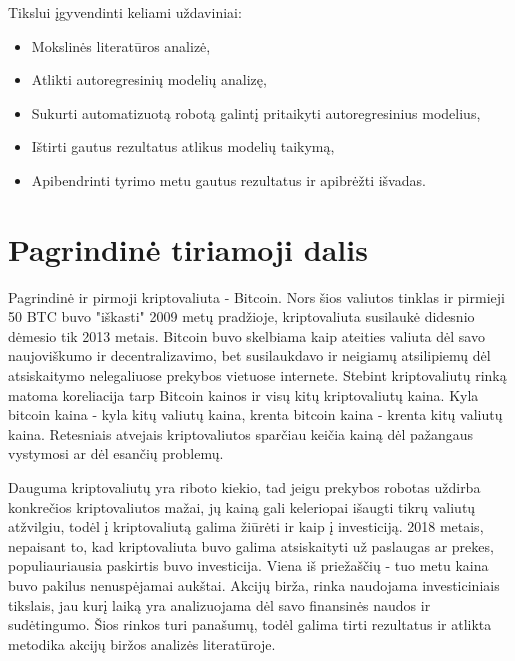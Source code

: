 \documentclass{VUMIFInfKursinis}
\begin{document}
Tikslui įgyvendinti keliami uždaviniai:
\begin{itemize}
  \item Mokslinės literatūros analizė, %
  \item Atlikti autoregresinių modelių analizę, %
  \item Sukurti automatizuotą robotą galintį pritaikyti autoregresinius modelius,
  \item Ištirti gautus rezultatus atlikus modelių taikymą, %
  \item Apibendrinti tyrimo metu gautus rezultatus ir apibrėžti išvadas.
\end{itemize}


\section{Pagrindinė tiriamoji dalis}
Pagrindinė ir pirmoji kriptovaliuta - Bitcoin. Nors šios valiutos tinklas ir pirmieji 50 BTC buvo "iškasti" 2009 metų pradžioje, kriptovaliuta susilaukė didesnio dėmesio
tik 2013 metais\cite{macdonell2014popping}. Bitcoin buvo skelbiama kaip ateities valiuta dėl savo naujoviškumo ir decentralizavimo, bet susilaukdavo ir 
neigiamų atsilipiemų dėl atsiskaitymo nelegaliuose prekybos vietuose internete. Stebint kriptovaliutų rinką matoma koreliacija tarp Bitcoin kainos ir visų kitų kriptovaliutų kaina.
Kyla bitcoin kaina - kyla kitų valiutų kaina, krenta bitcoin kaina - krenta kitų valiutų kaina. Retesniais atvejais kriptovaliutos sparčiau keičia kainą dėl 
pažangaus vystymosi ar dėl esančių problemų. 

Dauguma kriptovaliutų yra riboto kiekio, tad jeigu prekybos robotas uždirba konkrečios kriptovaliutos mažai, jų kainą gali keleriopai išaugti 
tikrų valiutų atžvilgiu, todėl į kriptovaliutą galima žiūrėti ir kaip į investiciją. 2018 metais, nepaisant to, kad kriptovaliuta buvo galima 
atsiskaityti už paslaugas ar prekes, populiauriausia paskirtis buvo investicija. Viena iš priežaščių - tuo metu kaina buvo pakilus nenuspėjamai
aukštai\cite{garg2018autoregressive}. Akcijų birža, rinka naudojama investiciniais tikslais, jau kurį laiką yra analizuojama dėl savo finansinės
naudos ir sudėtingumo. Šios rinkos turi panašumų, todėl galima tirti rezultatus ir atlikta metodika akcijų biržos analizės literatūroje.
\end{document}
